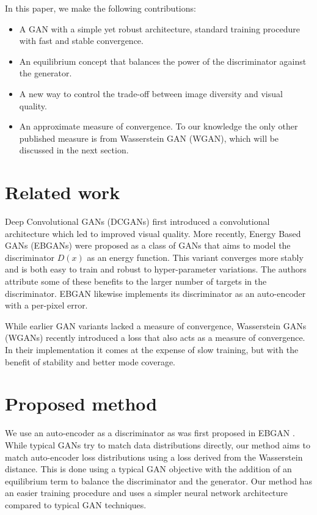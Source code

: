 \documentclass[english]{article}
\begin{document}
In this paper, we make the following contributions:
\begin{itemize}
\item A GAN with a simple yet robust architecture, standard training procedure
with fast and stable convergence.
\item An equilibrium concept that balances the power of the discriminator
against the generator. 
\item A new way to control the trade-off between image diversity and visual
quality.
\item An approximate measure of convergence. To our knowledge the only other
published measure is from Wasserstein GAN \cite{arjovsky2017wasserstein}
(WGAN), which will be discussed in the next section.
\end{itemize}

\section{Related work}

Deep Convolutional GANs \cite{radford2015unsupervised_dcgan}(DCGANs)
first introduced a convolutional architecture which led to improved
visual quality. More recently, Energy Based GANs \cite{zhao2016energy_ebgan}(EBGANs)
were proposed as a class of GANs that aims to model the discriminator
$D(x)$ as an energy function. This variant converges more stably
and is both easy to train and robust to hyper-parameter variations.
The authors attribute some of these benefits to the larger number
of targets in the discriminator. EBGAN likewise implements its discriminator
as an auto-encoder with a per-pixel error.

While earlier GAN variants lacked a measure of convergence, Wasserstein
GANs \cite{arjovsky2017wasserstein} (WGANs) recently introduced a
loss that also acts as a measure of convergence. In their implementation
it comes at the expense of slow training, but with the benefit of
stability and better mode coverage.


\section{Proposed method}

We use an auto-encoder as a discriminator as was first proposed in
EBGAN \cite{zhao2016energy_ebgan}. While typical GANs try to match
data distributions directly, our method aims to match auto-encoder
loss distributions using a loss derived from the Wasserstein distance.
This is done using a typical GAN objective with the addition of an
equilibrium term to balance the discriminator and the generator. Our
method has an easier training procedure and uses a simpler neural
network architecture compared to typical GAN techniques. 
\end{document}
